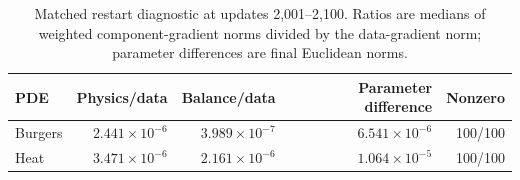 \begin{table}[ht]
\caption{Matched restart diagnostic at updates 2,001--2,100. Ratios are medians of weighted component-gradient norms divided by the data-gradient norm; parameter differences are final Euclidean norms.}\label{tab:revision_gradients}
\centering\small
\begin{tabular}{@{}lrrrr@{}}\toprule
PDE & Physics/data & Balance/data & Parameter difference & Nonzero\\\midrule
Burgers & $2.441\times10^{-6}$ & $3.989\times10^{-7}$ & $6.541\times10^{-6}$ & 100/100 \\
Heat & $3.471\times10^{-6}$ & $2.161\times10^{-6}$ & $1.064\times10^{-5}$ & 100/100 \\
\bottomrule\end{tabular}
\end{table}
